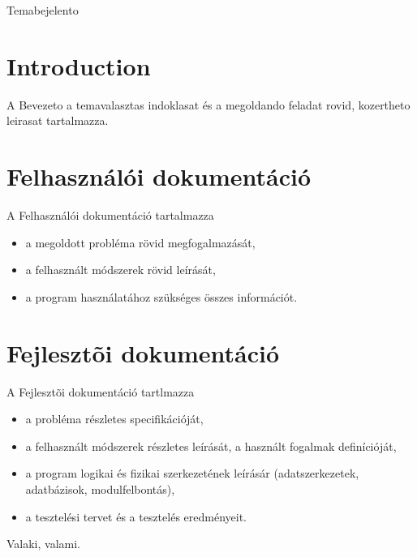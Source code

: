 \documentclass[a4paper,12pt]{report}
\begin{document}




\vspace*{\fill}
\begin{center}
Temabejelento
\end{center}
\vfill
\thispagestyle{empty}
\newpage
\setcounter{page}{1}


\tableofcontents



\chapter{Introduction}

A Bevezeto a temavalasztas indoklasat és a megoldando feladat rovid, kozertheto leirasat tartalmazza.




\chapter{Felhasználói dokumentáció}

A Felhasználói dokumentáció tartalmazza
\begin{itemize}
\item a megoldott probléma rövid megfogalmazását,
\item a felhasznált módszerek rövid leírását,
\item a program használatához szükséges összes információt.
\end{itemize}




\chapter{Fejlesztõi dokumentáció}

A Fejlesztõi dokumentáció tartlmazza
\begin{itemize}
\item a probléma részletes specifikációját,
\item a felhasznált módszerek részletes leírását, a használt fogalmak definícióját,
\item a program logikai és fizikai szerkezetének leírásár (adatszerkezetek, adatbázisok, modulfelbontás),
\item a tesztelési tervet és a tesztelés eredményeit.
\end{itemize}





\begin{thebibliography}{9}
 Valaki, valami.
\end{thebibliography}
\end{document}

